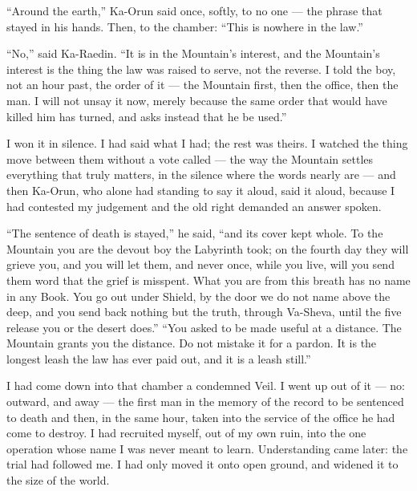 ``Around the earth,'' Ka-Orun said once, softly, to no one --- the phrase that stayed in his hands. Then, to the chamber: ``This is nowhere in the law.''\par

``No,'' said Ka-Raedin. ``It is in the Mountain's interest, and the Mountain's interest is the thing the law was raised to serve, not the reverse. I told the boy, not an hour past, the order of it --- the Mountain first, then the office, then the man. I will not unsay it now, merely because the same order that would have killed him has turned, and asks instead that he be used.''\par

I won it in silence. I had said what I had; the rest was theirs. I watched the thing move between them without a vote called --- the way the Mountain settles everything that truly matters, in the silence where the words nearly are --- and then Ka-Orun, who alone had standing to say it aloud, said it aloud, because I had contested my judgement and the old right demanded an answer spoken.\par

``The sentence of death is stayed,'' he said, ``and its cover kept whole. To the Mountain you are the devout boy the Labyrinth took; on the fourth day they will grieve you, and you will let them, and never once, while you live, will you send them word that the grief is misspent. What you are from this breath has no name in any Book. You go out under Shield, by the door we do not name above the deep, and you send back nothing but the truth, through Va-Sheva, until the five release you or the desert does.'' ``You asked to be made useful at a distance. The Mountain grants you the distance. Do not mistake it for a pardon. It is the longest leash the law has ever paid out, and it is a leash still.''\par

\ornament

I had come down into that chamber a condemned Veil. I went up out of it --- no: outward, and away --- the first man in the memory of the record to be sentenced to death and then, in the same hour, taken into the service of the office he had come to destroy. I had recruited myself, out of my own ruin, into the one operation whose name I was never meant to learn. Understanding came later: the trial had followed me. I had only moved it onto open ground, and widened it to the size of the world.\par

